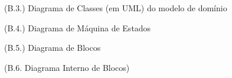 \documentclass[12pt,a4paper]{article}
\begin{document}
\begin{landscape}
  \begin{figure}
    \centering
    
    \caption{(B.3.) Diagrama de Classes (em UML) do modelo de domínio}
    \label{fig:uml}
  \end{figure}
\end{landscape}

\begin{landscape}
  \begin{figure}
    \centering
    
    \caption{(B.4.) Diagrama de Máquina de Estados}
    \label{fig:state-machine}
  \end{figure}
\end{landscape}

\begin{landscape}
  \begin{figure}
    \centering
    
    \caption{(B.5.) Diagrama de Blocos}
    \label{fig:bbd}
  \end{figure}
\end{landscape}

\begin{landscape}
  \begin{figure}
    \centering
    
    \caption{(B.6. Diagrama Interno de Blocos)}
    \label{fig:ibd}
  \end{figure}
\end{landscape}
\end{document}
